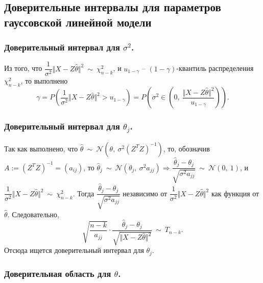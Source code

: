 \subsection{Доверительные интервалы для параметров гауссовской линейной модели}
\subsubsection{Доверительный интервал для $\sigma^{2}$.}

Из того, что $\displaystyle \dfrac{1}{\sigma ^{2}}\Vert X-Z\hat{\theta }\Vert ^{2} \ \sim \ \chi _{n-k}^{2}$, и $\displaystyle u_{1-\gamma }$ -- $\displaystyle ( 1-\gamma )$-квантиль распределения $\displaystyle \chi _{n-k}^{2}$, то выполнено
\begin{equation*}
    \gamma =P\left(\dfrac{1}{\sigma ^{2}}\Vert X-Z\hat{\theta }\Vert ^{2}  >u_{1-\gamma }\right) =P\left( \sigma ^{2} \in \left( 0,\ \dfrac{\Vert X-Z\hat{\theta }\Vert ^{2}}{u_{1-\gamma }}\right)\right) .
\end{equation*}
\subsubsection{Доверительный интервал для $\theta_{j}$.}

Так как выполнено, что $\displaystyle \hat{\theta } \ \sim \ \mathcal{N}\left( \theta ,\ \sigma ^{2}\left( Z^{T} Z\right)^{-1}\right)$, то, обозначив $\displaystyle A:=\left( Z^{T} Z\right)^{-1} =( a_{ij})$, то $\displaystyle \hat{\theta }_{j} \ \sim \ \mathcal{N}\left( \theta _{j} ,\ \sigma ^{2} a_{jj}\right) \Rightarrow \dfrac{\hat{\theta }_{j} -\theta _{j}}{\sqrt{\sigma ^{2} a_{jj}}} \ \sim \ \mathcal{N}( 0,\ 1)$, и $\displaystyle \dfrac{1}{\sigma ^{2}}\Vert X-Z\hat{\theta }\Vert ^{2} \ \sim \ \chi _{n-k}^{2}$. Тогда $\displaystyle \dfrac{\hat{\theta }_{j} -\theta _{j}}{\sqrt{\sigma ^{2} a_{jj}}}$ независимо от $\displaystyle \dfrac{1}{\sigma ^{2}}\Vert X-Z\hat{\theta }\Vert ^{2}$ как функция от $\displaystyle \hat{\theta }$. Следовательно,
\begin{equation*}
    \sqrt{\dfrac{n-k}{a_{jj}}} \cdotp \dfrac{\hat{\theta }_{j} -\theta _{j}}{\sqrt{\Vert X-Z\hat{\theta }\Vert ^{2}}} \ \sim \ T_{n-k} .
\end{equation*}
Отсюда ищется доверительный интервал для $\displaystyle \theta _{j}$.


\subsubsection{Доверительная область для $\theta$.}

